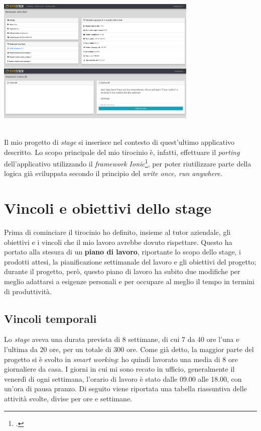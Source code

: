 \begin{minipage}{\linewidth}
  \centering
    \includegraphics[height=6cm]{immagini/webapp}
\end{minipage} \\

Il mio progetto di \textit{stage} si inserisce nel contesto di quest'ultimo applicativo descritto. Lo scopo principale del mio tirocinio è, infatti, effettuare il \textit{porting} dell'applicativo utilizzando il \textit{framework Ionic}\footcite{tec:ionic}, per poter riutilizzare parte della logica già sviluppata secondo il principio del \textit{write once, run anywhere}.


\section{Vincoli e obiettivi dello stage}

Prima di cominciare il tirocinio ho definito, insieme al tutor aziendale, gli obiettivi e i vincoli che il mio lavoro avrebbe dovuto rispettare. Questo ha portato alla stesura di un \textbf{piano di lavoro}, riportante lo scopo dello stage, i prodotti attesi, la pianificazione settimanale del lavoro e gli obiettivi del progetto; durante il progetto, però, questo piano di lavoro ha subito due modifiche per meglio adattarsi a esigenze personali e per occupare al meglio il tempo in termini di produttività.

\subsection{Vincoli temporali}

Lo \textit{stage} aveva una durata prevista di 8 settimane, di cui 7 da 40 ore l'una e l'ultima da 20 ore, per un totale di 300 ore. Come già detto, la maggior parte del progetto si è svolto in \textit{smart working}: ho quindi lavorato una media di 8 ore giornaliere da casa. I giorni in cui mi sono recato in ufficio, generalmente il venerdì di ogni settimana, l'orario di lavoro è stato dalle 09.00 alle 18.00, con un'ora di pausa pranzo. Di seguito viene riportata una tabella riassuntiva delle attività svolte, divise per ore e settimane. \newpage

